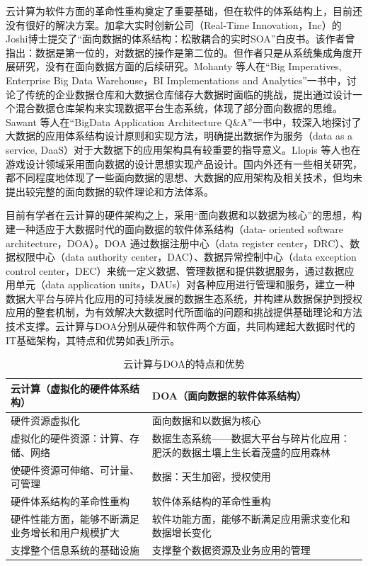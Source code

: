 \documentclass[article]{BJTU-thesis}
\begin{document}
  	云计算为软件方面的革命性重构奠定了重要基础，但在软件的体系结构上，目前还没有很好的解决方案。加拿大实时创新公司（Real-Time Innovation，Inc）的Joshi博士提交了“面向数据的体系结构：松散耦合的实时SOA”白皮书。该作者曾指出：数据是第一位的，对数据的操作是第二位的。但作者只是从系统集成角度开展研究，没有在面向数据方面的后续研究。Mohanty 等人在“Big Imperatives, Enterprise Big Data Warehouse，BI Implementations and Analytics”一书中，讨论了传统的企业数据仓库和大数据仓库储存大数据时面临的挑战，提出通过设计一个混合数据仓库架构来实现数据平台生态系统，体现了部分面向数据的思维。Sawant 等人在“BigData Application Architecture Q\&A”一书中，较深入地探讨了大数据的应用体系结构设计原则和实现方法，明确提出数据作为服务（data as a service, DaaS）对于大数据下的应用架构具有较重要的指导意义。Llopis 等人也在游戏设计领域采用面向数据的设计思想实现产品设计。国内外还有一些相关研究，都不同程度地体现了一些面向数据的思想、大数据的应用架构及相关技术，但均未提出较完整的面向数据的软件理论和方法体系。

	目前有学者在云计算的硬件架构之上，采用“面向数据和以数据为核心”的思想，构建一种适应于大数据时代的面向数据的软件体系结构（data- oriented software architecture，DOA）。DOA 通过数据注册中心（data register center，DRC）、数据权限中心（data authority center，DAC）、数据异常控制中心（data exception control center，DEC）来统一定义数据、管理数据和提供数据服务，通过数据应用单元（data application units，DAUs）对各种应用进行管理和服务，建立一种数据大平台与碎片化应用的可持续发展的数据生态系统，并构建从数据保护到授权应用的整套机制，为有效解决大数据时代所面临的问题和挑战提供基础理论和方法技术支撑。云计算与DOA分别从硬件和软件两个方面，共同构建起大数据时代的 IT基础架构，其特点和优势如表\ref{tab:aStrangeTable}所示。

	\begin{table}[!htbp]
		\centering
		\caption{云计算与DOA的特点和优势}\label{tab:aStrangeTable}
		\begin{tabular}{p{7cm}p{7cm}}
			\toprule
			云计算（虚拟化的硬件体系结构）& DOA（面向数据的软件体系结构）\\
			\midrule
			硬件资源虚拟化& 面向数据和以数据为核心\\
			\midrule
			虚拟化的硬件资源：计算、存储、网络&数据生态系统——数据大平台与碎片化应用：肥沃的数据土壤上生长着茂盛的应用森林\\
			\midrule
			使硬件资源可伸缩、可计量、可管理&数据：天生加密，授权使用\\
			\midrule
			硬件体系结构的革命性重构&软件体系结构的革命性重构\\
			\midrule
			硬件性能方面，能够不断满足业务增长和用户规模扩大&软件功能方面，能够不断满足应用需求变化和数据增长变化\\
			\midrule
			支撑整个信息系统的基础设施&支撑整个数据资源及业务应用的管理\\
			\bottomrule
		\end{tabular}
	
	\end{table}
	
\end{document}

